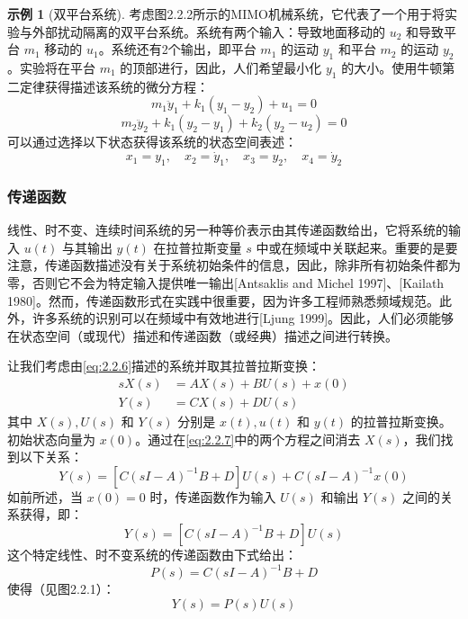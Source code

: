 \documentclass[UTF8,12pt,a4paper]{ctexart}
\theoremstyle{definition}
\newtheorem{example}{示例}[section]
\begin{document}
\begin{example}[双平台系统]
考虑图2.2.2所示的MIMO机械系统，它代表了一个用于将实验与外部扰动隔离的双平台系统。系统有两个输入：导致地面移动的 $u_2$ 和导致平台 $m_1$ 移动的 $u_1$。系统还有2个输出，即平台 $m_1$ 的运动 $y_1$ 和平台 $m_2$ 的运动 $y_2$。实验将在平台 $m_1$ 的顶部进行，因此，人们希望最小化 $y_1$ 的大小。使用牛顿第二定律获得描述该系统的微分方程：
\[
m_1 \ddot{y}_1 + k_1(y_1 - y_2) + u_1 = 0
\]
\[
m_2 \ddot{y}_2 + k_1(y_2 - y_1) + k_2(y_2 - u_2) = 0
\]
可以通过选择以下状态获得该系统的状态空间表述：
\[
x_1 = y_1, \quad x_2 = \dot{y}_1, \quad x_3 = y_2, \quad x_4 = \dot{y}_2
\]
\end{example}

\subsubsection{传递函数}

线性、时不变、连续时间系统的另一种等价表示由其传递函数给出，它将系统的输入 $u(t)$ 与其输出 $y(t)$ 在拉普拉斯变量 $s$ 中或在频域中关联起来。重要的是要注意，传递函数描述没有关于系统初始条件的信息，因此，除非所有初始条件都为零，否则它不会为特定输入提供唯一输出[Antsaklis and Michel 1997]、[Kailath 1980]。然而，传递函数形式在实践中很重要，因为许多工程师熟悉频域规范。此外，许多系统的识别可以在频域中有效地进行[Ljung 1999]。因此，人们必须能够在状态空间（或现代）描述和传递函数（或经典）描述之间进行转换。

让我们考虑由\eqref{eq:2.2.6}描述的系统并取其拉普拉斯变换：
\begin{equation}\label{eq:2.2.7}
\begin{aligned}
sX(s) &= AX(s) + BU(s) + x(0) \\
Y(s) &= CX(s) + DU(s)
\end{aligned}
\end{equation}
其中 $X(s), U(s)$ 和 $Y(s)$ 分别是 $x(t), u(t)$ 和 $y(t)$ 的拉普拉斯变换。初始状态向量为 $x(0)$。通过在\eqref{eq:2.2.7}中的两个方程之间消去 $X(s)$，我们找到以下关系：
\begin{equation}\label{eq:2.2.8}
Y(s) = [C(sI-A)^{-1}B + D]U(s) + C(sI-A)^{-1}x(0)
\end{equation}
如前所述，当 $x(0)=0$ 时，传递函数作为输入 $U(s)$ 和输出 $Y(s)$ 之间的关系获得，即：
\begin{equation}\label{eq:2.2.9}
Y(s) = [C(sI-A)^{-1}B + D]U(s)
\end{equation}
这个特定线性、时不变系统的传递函数由下式给出：
\begin{equation}\label{eq:2.2.10}
P(s) = C(sI-A)^{-1}B + D
\end{equation}
使得（见图2.2.1）：
\begin{equation}\label{eq:2.2.11}
Y(s) = P(s)U(s)
\end{equation}
\end{document}
